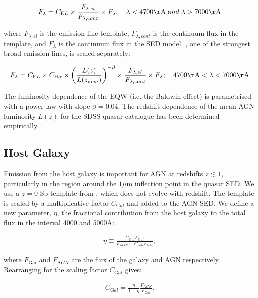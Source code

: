 \begin{eqnarray}
  F_{\lambda} =  C_{\mathrm EL} \times \frac{F_{\lambda, \mathrm el}}{F_{\lambda, \mathrm cont}} \times F_{\lambda} ; \quad \lambda < 4700{\mathrm \AA} \;{\mathrm and}\; \lambda > 7000{\mathrm \AA} 
\end{eqnarray} 

where $F_{\lambda, \mathrm el}$ is the emission line template, $F_{\lambda,\mathrm cont}$ is the continuum flux in the template, and $F_{\lambda}$ is the continuum flux in the SED model.  
\hans, one of the strongest broad emission lines, is scaled separately: 

\begin{equation}
  F_{\lambda} =  C_{\mathrm EL} \times C_{{\mathrm H} \alpha} \times \left( \frac{L(z)} {L(z_{\mathrm nrm})} \right)^{-\beta} \times \frac{F_{\lambda, \mathrm el}}{F_{\lambda, \mathrm cont}} \times F_{\lambda}; \quad 4700{\mathrm \AA} < \lambda < 7000{\mathrm \AA} 
\end{equation}

The luminosity dependence of the \ha EQW (i.e. the Baldwin effect) is parametrised with a power-law with slope $\beta=0.04$.
The redshift dependence of the mean AGN luminosity $L(z)$ for the SDSS quasar catalogue has been determined empirically.

\subsection{Host Galaxy}

Emission from the host galaxy is important for AGN at redshifts $z\lesssim1$, particularly in the region around the $1\mu$m inflection point in the quasar SED. 
We use a $z=0$ Sb template from \citet{mannucci01}, which does not evolve with redshift.
The template is scaled by a multiplicative factor $C_{\mathrm Gal}$ and added to the AGN SED. 
We define a new parameter, $\eta$, the fractional contribution from the host galaxy to the total flux in the interval 4000 and 5000\AA:

\begin{eqnarray}
  \eta \equiv \frac{C_{\mathrm Gal}F_{\mathrm Gal}}{F_{\mathrm AGN} + C_{\mathrm Gal}F_{\mathrm Gal}},
\end{eqnarray}

where $F_{\mathrm Gal}$ and $F_{\mathrm AGN}$ are the flux of the galaxy and AGN respectively. 
Rearranging for the scaling factor $C_{\mathrm Gal}$ gives:

\begin{eqnarray}
  C_{\mathrm Gal} = \frac{\eta}{1 - \eta} \frac{F_{\mathrm AGN}}{F_{\mathrm Gal}}.
\end{eqnarray}

